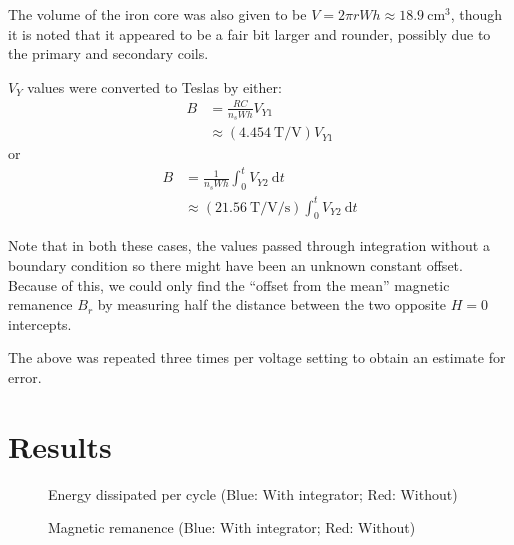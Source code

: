 \documentclass[a4paper]{scrartcl}
\begin{document}
The volume of the iron core was also given to be \(V = 2 \pi r W h \approx \SI{18.9}{\centi\metre\cubed}\), though it is noted that it appeared to be a fair bit larger and rounder, possibly due to the primary and secondary coils.

\(V_Y\) values were converted to Teslas by either:
\begin{align*}
    B &= \frac{R C}{n_s W h} V_{Y1} \\
    &\approx (\SI{4.454}{\tesla\per\volt}) V_{Y1}
\end{align*}
or
\begin{align*}
    B &= \frac{1}{n_s W h} \int_0^t V_{Y2} \:\mathrm{d}t \\
    &\approx (\SI{21.56}{\tesla\per\volt\per\second}) \int_0^t V_{Y2} \:\mathrm{d}t
\end{align*}

Note that in both these cases, the values passed through integration without a boundary condition so there might have been an unknown constant offset. Because of this, we could only find the ``offset from the mean'' magnetic remanence \(B_r\) by measuring half the distance between the two opposite \(H = 0\) intercepts.

The above was repeated three times per voltage setting to obtain an estimate for error.

\section{Results}
\begin{figure}
    \centering
    \caption{Energy dissipated per cycle (Blue: With integrator; Red: Without)}
    \label{fig:energy-per-cycle}
\end{figure}

\begin{figure}
    \centering
    \caption{Magnetic remanence (Blue: With integrator; Red: Without)}
    \label{fig:magnetic-remanence}
\end{figure}
\end{document}
